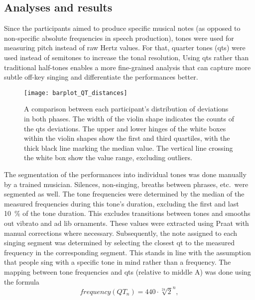 \subsection{Analyses and results}
\label{subsec:results_music}

Since the participants aimed to produce specific musical notes (as opposed to non-specific absolute frequencies in speech production), tones were used for measuring pitch instead of raw Hertz values.
For that, quarter tones (\acfp{qt}) were used instead of semitones to increase the tonal resolution, 
Using \acp{qt} rather than traditional half-tones enables a more fine-grained analysis that can capture more subtle off-key singing and differentiate the performances better.
%
\begin{figure}[t!]
	\centering
	\texttt{[image: barplot\_QT\_distances]}
	\caption[Violin distributional comparison of participants' singing deviations in both phases]
		{A comparison between each participant's distribution of deviations in both phases.
		 The width of the violin shape indicates the counts of the \acsp{qt} deviations.
		 The upper and lower hinges of the white boxes within the violin shapes show the first and third quartiles, with the thick black line marking the median value.
		 The vertical line crossing the white box show the value range, excluding outliers.}
	\label{fig:barplot_QT_distances}
\end{figure}
%
The segmentation of the performances into individual tones was done manually by a trained musician.
Silences, non-singing, breaths between phrases, etc.\ were segmented as well.
The tone frequencies were determined by the median of the measured frequencies during this tone's duration, excluding the first and last \SI{10}{\percent} of the tone duration.
This excludes transitions between tones and smooths out vibrato and ad lib ornaments.
These values were extracted using Praat \citep{Boersma2018praat} with manual corrections where necessary.
Subsequently, the note assigned to each singing segment was determined by selecting the closest \ac{qt} to the measured frequency in the corresponding segment.
This stands in line with the assumption that people sing with a specific tone in mind rather than a frequency.
The mapping between tone frequencies and \acp{qt} (relative to middle A) was done using the formula
%
\begin{equation}
	\label{eq:quarter_tones_formula}
	frequency(QT_n) = 440 \cdot \sqrt[24]{2}^n,
\end{equation}
